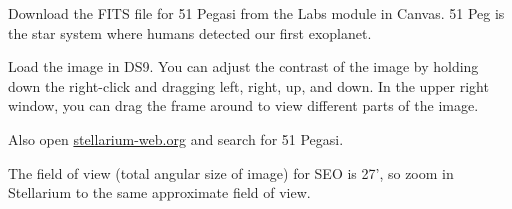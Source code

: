 
\begin{steps}
	\item Download the FITS file for 51 Pegasi from the Labs module in Canvas. 51 Peg is the star system where humans detected our first exoplanet.
	
	
	\item Load the image in DS9. You can adjust the contrast of the image by holding down the right-click and dragging left, right, up, and down. In the upper right window, you can drag the frame around to view different parts of the image.

	

	\item Also open \url{stellarium-web.org} and search for 51 Pegasi.
	

	\item The field of view (total angular size of image) for SEO is 27', so zoom in Stellarium to the same approximate field of view.
	

\end{steps}
